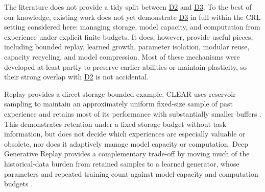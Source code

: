 \documentclass[10pt,journal,compsoc]{IEEEtran}
\DeclareRobustCommand{\Dref}[1]{\hyperref[sec:d#1]{D#1}}
\begin{document}
The literature does not provide a tidy split between \Dref{2} and \Dref{3}.
To the best of our knowledge, existing work does not yet demonstrate \Dref{3} in full within the CRL setting considered here: managing storage, model capacity, and computation from experience under explicit finite budgets.
It does, however, provide useful pieces, including bounded replay, learned growth, parameter isolation, modular reuse, capacity recycling, and model compression.
Most of these mechanisms were developed at least partly to preserve earlier abilities or maintain plasticity, so their strong overlap with \Dref{2} is not accidental.

Replay provides a direct storage-bounded example.
CLEAR uses reservoir sampling to maintain an approximately uniform fixed-size sample of past experience and retains most of its performance with substantially smaller buffers \cite{rolnick2019}.
This demonstrates retention under a fixed storage budget without task information, but does not decide which experiences are especially valuable or obsolete, nor does it adaptively manage model capacity or computation.
Deep Generative Replay provides a complementary trade-off by moving much of the historical-data burden from retained samples to a learned generator, whose parameters and repeated training count against model-capacity and computation budgets \cite{shin2017}.
\end{document}
